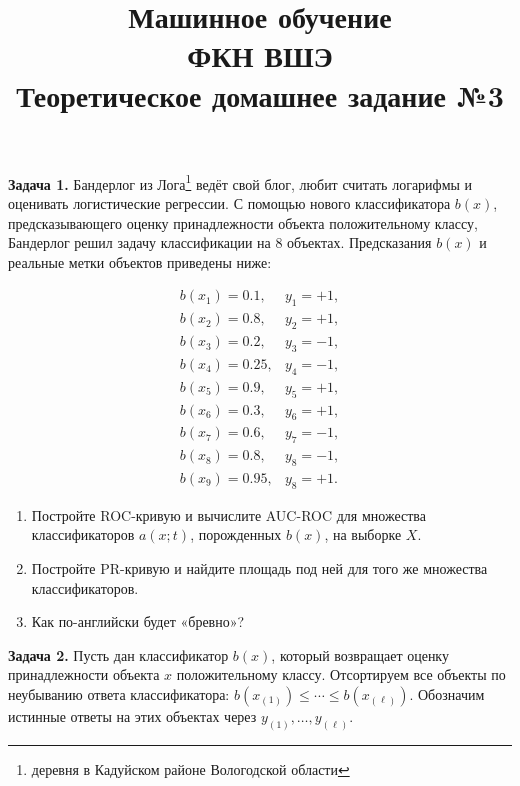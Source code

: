 \documentclass[12pt,fleqn]{article}
\begin{document}
\title{Машинное обучение\\ФКН ВШЭ\\Теоретическое домашнее задание №3}

\date{}

\author{}

\maketitle


\textbf{Задача 1.} Бандерлог из Лога\footnote{деревня в Кадуйском районе Вологодской области} ведёт свой блог, любит считать логарифмы и оценивать логистические регрессии. С помощью нового классификатора $b(x)$, предсказывающего оценку принадлежности объекта положительному классу, Бандерлог решил задачу классификации на 8 объектах. Предсказания $b(x)$ и реальные метки объектов приведены ниже:

$$
\begin{array}{lc}
b\left(x_{1}\right)=0.1, & y_{1}=+1, \\
b\left(x_{2}\right)=0.8, & y_{2}=+1, \\
b\left(x_{3}\right)=0.2, & y_{3}=-1, \\
b\left(x_{4}\right)=0.25, & y_{4}=-1, \\
b\left(x_{5}\right)=0.9, & y_{5}=+1, \\
b\left(x_{6}\right)=0.3, & y_{6}=+1, \\
b\left(x_{7}\right)=0.6, & y_{7}=-1, \\
b\left(x_{8}\right)=0.8, & y_{8}=-1, \\
b\left(x_{9}\right)=0.95, & y_{8}=+1 .
\end{array}
$$

\begin{enumerate}
  \item Постройте ROC-кривую и вычислите AUC-ROC для множества классификаторов $a(x ; t)$, порожденных $b(x)$, на выборке $X$.
  \item Постройте PR-кривую и найдите площадь под ней для того же множества классификаторов.
  \item Как по-английски будет «бревно»?
\end{enumerate}

\textbf{Задача 2.} Пусть дан классификатор $b(x)$, который возвращает оценку принадлежности объекта $x$ положительному классу. Отсортируем все объекты по неубыванию ответа классификатора: $b\left(x_{(1)}\right) \leq \cdots \leq b\left(x_{(\ell)}\right)$. Обозначим истинные ответы на этих объектах через $y_{(1)}, \ldots, y_{(\ell)}$.
\end{document}
